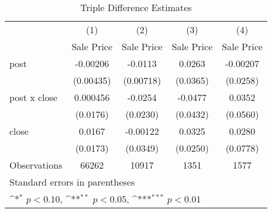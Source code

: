 \begin{table}[htbp]\centering
\def\sym#1{\ifmmode^{#1}\else\(^{#1}\)\fi}
\caption{Triple Difference Estimates\label{tabl}}
\begin{tabular}{l*{4}{c}}
\hline\hline
                    &\multicolumn{1}{c}{(1)}&\multicolumn{1}{c}{(2)}&\multicolumn{1}{c}{(3)}&\multicolumn{1}{c}{(4)}\\
                    &\multicolumn{1}{c}{Sale Price}&\multicolumn{1}{c}{Sale Price}&\multicolumn{1}{c}{Sale Price}&\multicolumn{1}{c}{Sale Price}\\
\hline
post                &    -0.00206         &     -0.0113         &      0.0263         &    -0.00207         \\
                    &   (0.00435)         &   (0.00718)         &    (0.0365)         &    (0.0258)         \\
[1em]
post x close        &    0.000456         &     -0.0254         &     -0.0477         &      0.0352         \\
                    &    (0.0176)         &    (0.0230)         &    (0.0432)         &    (0.0560)         \\
[1em]
close               &      0.0167         &    -0.00122         &      0.0325         &      0.0280         \\
                    &    (0.0173)         &    (0.0349)         &    (0.0250)         &    (0.0778)         \\
\hline
Observations        &       66262         &       10917         &        1351         &        1577         \\
\hline\hline
\multicolumn{5}{l}{\footnotesize Standard errors in parentheses}\\
\multicolumn{5}{l}{\footnotesize \sym{*} \(p<0.10\), \sym{**} \(p<0.05\), \sym{***} \(p<0.01\)}\\
\end{tabular}
\end{table}
